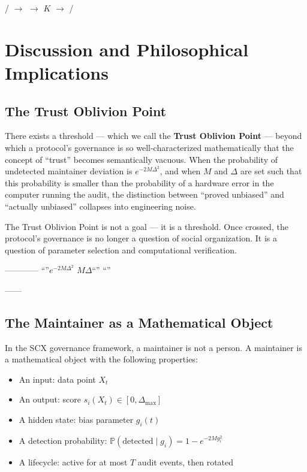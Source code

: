 \documentclass[12pt,a4paper]{article}
\theoremstyle{remark}
\newcommand{\Pbb}{\mathbb{P}}
\begin{document}
\noindent\textbf{}
/ $\to$  $\to$ $K$ $\to$ 
/ 

\newpage

\section{}
\section{Discussion and Philosophical Implications}

\subsection{The Trust Oblivion Point}

There exists a threshold — which we call the \textbf{Trust Oblivion Point} —
beyond which a protocol's governance is so well-characterized mathematically
that the concept of ``trust'' becomes semantically vacuous. When the probability
of undetected maintainer deviation is $e^{-2M\Delta^2}$, and when $M$ and
$\Delta$ are set such that this probability is smaller than the probability of
a hardware error in the computer running the audit, the distinction between
``proved unbiased'' and ``actually unbiased'' collapses into engineering noise.

The Trust Oblivion Point is not a goal — it is a threshold. Once crossed, the
protocol's governance is no longer a question of social organization. It is a
question of parameter selection and computational verification.

\noindent\textbf{}
————
“”$e^{-2M\Delta^2}$
$M$$\Delta$“”
“”

——


\subsection{The Maintainer as a Mathematical Object}

In the SCX governance framework, a maintainer is not a person. A maintainer is
a mathematical object with the following properties:

\begin{itemize}[leftmargin=*]
    \item An input: data point $X_t$
    \item An output: score $s_i(X_t) \in [0, \Delta_{\max}]$
    \item A hidden state: bias parameter $g_i(t)$
    \item A detection probability: $\Pbb(\text{detected} \mid g_i) = 1 - e^{-2M g_i^2}$
    \item A lifecycle: active for at most $T$ audit events, then rotated
\end{itemize}
\end{document}
